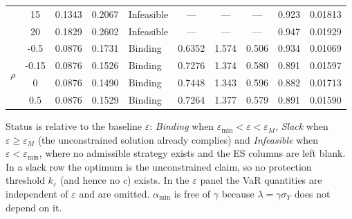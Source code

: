 \begin{table}[htbp]
\begin{tabular}{lc cc l cc cc c}
   & 15 & 0.1343 & 0.2067 & Infeasible & --- & --- & --- & 0.923 & 0.01813 \\
   & 20 & 0.1829 & 0.2602 & Infeasible & --- & --- & --- & 0.947 & 0.01929 \\
  \midrule
  \multirow{4}{*}{$\rho$} & -0.5 & 0.0876 & 0.1731 & Binding & 0.6352 & 1.574 & 0.506 & 0.934 & 0.01069 \\
   & -0.15 & 0.0876 & 0.1526 & Binding & 0.7276 & 1.374 & 0.580 & 0.891 & 0.01597 \\
   & 0 & 0.0876 & 0.1490 & Binding & 0.7448 & 1.343 & 0.596 & 0.882 & 0.01713 \\
   & 0.5 & 0.0876 & 0.1529 & Binding & 0.7264 & 1.377 & 0.579 & 0.891 & 0.01590 \\
\bottomrule
\end{tabular}

\vspace{2pt}
{\footnotesize Status is relative to the baseline $\varepsilon$: \emph{Binding}
when $\varepsilon_{\min} < \varepsilon < \varepsilon_M$, \emph{Slack} when
$\varepsilon \geq \varepsilon_M$ (the unconstrained solution already complies)
and \emph{Infeasible} when $\varepsilon < \varepsilon_{\min}$, where no
admissible strategy exists and the ES columns are left blank. In a slack row
the optimum is the unconstrained claim, so no protection threshold
$k_\varepsilon$ (and hence no $c$) exists. In the $\varepsilon$ panel the VaR
quantities are independent of $\varepsilon$ and are omitted. $\alpha_{\min}$ is
free of $\gamma$ because $\lambda = \gamma\sigma_Y$ does not depend on it.}
\end{table}
